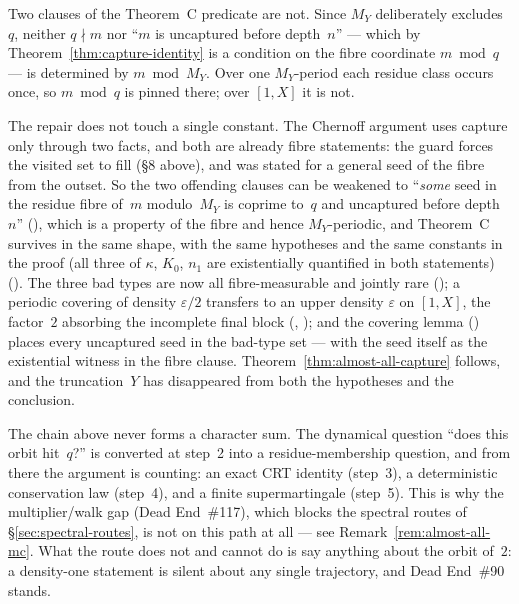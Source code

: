 Two clauses of the Theorem~C predicate are not.  Since $M_Y$ deliberately
excludes~$q$, neither $q \nmid m$ nor ``$m$ is uncaptured before depth~$n$''
--- which by Theorem~\ref{thm:capture-identity} is a condition on the fibre
coordinate $m \bmod q$ --- is determined by $m \bmod M_Y$.  Over one
$M_Y$-period each residue class occurs once, so $m \bmod q$ is pinned there;
over $[1,X]$ it is not.

The repair does not touch a single constant.  The Chernoff argument uses
capture only through two facts, and both are already fibre statements: the
guard forces the visited set to fill (\S8 above), and
 was
stated for a general seed of the fibre from the outset.  So the two
offending clauses can be weakened to ``\emph{some} seed in the residue
fibre of~$m$ modulo~$M_Y$ is coprime to~$q$ and uncaptured before
depth~$n$'' (), which is a
property of the fibre and hence $M_Y$-periodic, and Theorem~C survives
in the same shape, with the same hypotheses and the same constants in the
proof (all three of $\kappa$, $K_0$, $n_1$ are existentially quantified in
both statements)
().  The three
bad types are now all fibre-measurable and jointly rare
(); a periodic
covering of density $\varepsilon/2$ transfers to an upper density
$\varepsilon$ on $[1,X]$, the factor~$2$ absorbing the incomplete final
block
(,
 ); and
the covering lemma
()
places every uncaptured seed in the bad-type set --- with the seed itself as
the existential witness in the fibre clause.  Theorem~\ref{thm:almost-all-capture}
follows, and the truncation~$Y$ has disappeared from both the hypotheses and
the conclusion.

\begin{remark}
The chain above never forms a character sum.  The dynamical question ``does
this orbit hit~$q$?'' is converted at step~2 into a residue-membership
question, and from there the argument is counting: an exact CRT identity
(step~3), a deterministic conservation law (step~4), and a finite
supermartingale (step~5).  This is why the multiplier/walk gap
(Dead End~\#117), which blocks the spectral routes of
\S\ref{sec:spectral-routes}, is not on this path at all --- see
Remark~\ref{rem:almost-all-mc}.  What the route does not and cannot do is
say anything about the orbit of~$2$: a density-one statement is silent
about any single trajectory, and Dead End~\#90 stands.
\end{remark}


